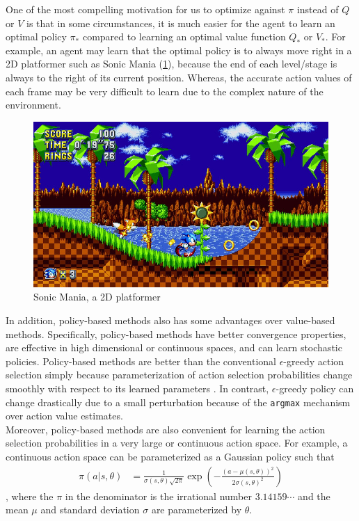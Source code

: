 \documentclass[12pt]{report}
\begin{document}
One of the most compelling motivation for us to optimize against $\pi$ instead of $Q$ or $V$ is that in some circumstances, it is much easier for the agent to learn an optimal policy $\pi_*$ compared to learning an optimal value function $Q_*$ or $V_*$. For example, an agent may learn that the optimal policy is to always move right in a 2D platformer such as Sonic Mania (\ref{fig:sonic}), because the end of each level/stage is always to the right of its current position. Whereas, the accurate action values of each frame may be very difficult to learn due to the complex nature of the environment.
\begin{figure}[H]
    \center
    \includegraphics[width=0.3\linewidth]{figs/sonic_mania.jpg}
    \caption{Sonic Mania, a 2D platformer}
    \label{fig:sonic}
\end{figure}
In addition, policy-based methods also has some advantages over value-based methods. Specifically, policy-based methods have better convergence properties, are effective in high dimensional or continuous spaces, and can learn stochastic policies. Policy-based methods are better than the conventional $\epsilon$-greedy action selection simply because parameterization of action selection probabilities change smoothly with respect to its learned parameters \cite{sutton2018reinforcement}. In contrast, $\epsilon$-greedy policy can change drastically due to a small perturbation because of the \texttt{argmax} mechanism over action value estimates.\\

Moreover, policy-based methods are also convenient for learning the action selection probabilities in a very large or continuous action space. For example, a continuous action space can be parameterized as a Gaussian policy such that
\begin{align}
    \pi(a|s,\theta) &= \frac{1}{\sigma(s,\theta)\sqrt{2\pi}}\exp \left(-\frac{(a-\mu(s,\theta))^2}{2\sigma(s,\theta)^2}\right)
\end{align}
, where the $\pi$ in the denominator is the irrational number $3.14159\cdots$ and the mean $\mu$ and standard deviation $\sigma$ are parameterized by $\theta$.\\
\end{document}
